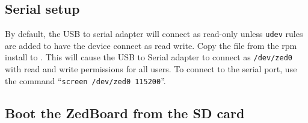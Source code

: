 \subsection*{Serial setup}
By default, the USB to serial adapter will connect as read-only unless \texttt{udev} rules are added to have the device connect as read write.  Copy the file from the rpm install  to .  This will cause the USB to Serial adapter to connect as \texttt{/dev/zed0} with read and write permissions for all users.  To connect to the serial port, use the command ``\texttt{screen /dev/zed0 115200}''.
\newpage
\subsection*{Boot the ZedBoard from the SD card}
